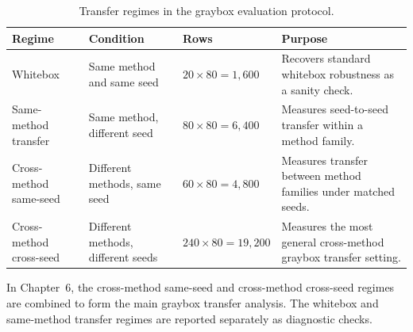 \begin{table}[H]
\centering
\caption{Transfer regimes in the graybox evaluation protocol.}
\label{tab:ch5_graybox_transfer_regimes}
\footnotesize
\setlength{\tabcolsep}{4pt}
\renewcommand{\arraystretch}{1.08}
\begin{tabularx}{\textwidth}{@{}
>{\raggedright\arraybackslash}p{}
>{\raggedright\arraybackslash}p{}
>{\raggedright\arraybackslash}p{}
>{\raggedright\arraybackslash}X
@{}}
\toprule
Regime & Condition & Rows & Purpose \\
\midrule

Whitebox
& Same method and same seed
& $20 \times 80 = 1{,}600$
& Recovers standard whitebox robustness as a sanity check. \\

Same-method transfer
& Same method, different seed
& $80 \times 80 = 6{,}400$
& Measures seed-to-seed transfer within a method family. \\

Cross-method same-seed
& Different methods, same seed
& $60 \times 80 = 4{,}800$
& Measures transfer between method families under matched seeds. \\

Cross-method cross-seed
& Different methods, different seeds
& $240 \times 80 = 19{,}200$
& Measures the most general cross-method graybox transfer setting. \\

\bottomrule
\end{tabularx}
\end{table}

In Chapter~6, the cross-method same-seed and cross-method cross-seed regimes are
combined to form the main graybox transfer analysis. The whitebox and same-method
transfer regimes are reported separately as diagnostic checks.
